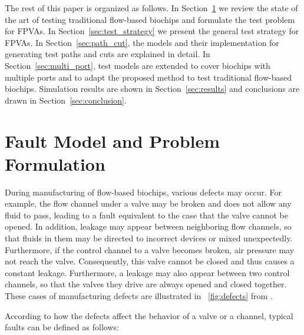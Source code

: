 \documentclass[journal,twoside]{IEEEtran}
\begin{document}
The rest of this paper is organized as follows. In
Section~\ref{sec:formulation} we review the state of the art of
testing traditional flow-based biochips and formulate the test problem for FPVAs.
In Section~\ref{sec:test_strategy} we present the general test strategy 
for FPVAs. 
In Section~\ref{sec:path_cut}, the models and their implementation for generating test paths and cuts
are explained in detail.
In Section~\ref{sec:multi_port}, test models are extended to cover biochips
with multiple ports and to adapt the proposed method to test traditional flow-based biochips.
Simulation results are shown in Section~\ref{sec:results} and
conclusions are drawn in Section~\ref{sec:conclusion}.



\section{Fault Model and Problem Formulation}\label{sec:formulation}

During manufacturing of flow-based biochips, various defects may occur. For
example,  the flow channel under a valve may be broken
and does not allow any fluid to pass, leading to a fault equivalent to the
case that the valve cannot be opened. In addition,  leakage may appear between
neighboring flow channels, so that fluids in them may be directed to incorrect
devices or mixed unexpectedly. Furthermore, if the control channel to a valve
becomes broken, air pressure  may not reach the valve. Consequently, this valve
cannot be closed and thus causes a constant leakage.  Furthermore, a leakage may
also appear between two control channels, so that  the valves they drive are
always opened and closed together. 
These cases of manufacturing defects are illustrated 
in \figname~\ref{fig:defects} from \cite{HuYHC14}.



According to how the defects affect the behavior of a valve or a channel,
typical faults 
can be defined as follows:
\end{document}
